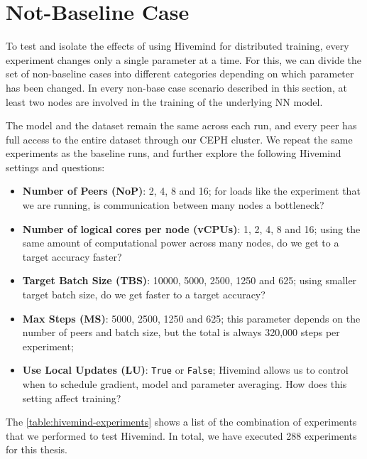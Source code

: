 \section{Not-Baseline Case}\label{sec:not-baseline-case}

To test and isolate the effects of using Hivemind for distributed training, every experiment changes only a single parameter at a time.
For this, we can divide the set of non-baseline cases into different categories depending on which parameter has been changed.
In every non-base case scenario described in this section, at least two nodes are involved in the training of the underlying NN model.

The model and the dataset remain the same across each run, and every peer has full access to the entire dataset through our CEPH cluster.
We repeat the same experiments as the baseline runs, and further explore the following Hivemind settings and questions:
\begin{itemize}
    \item \textbf{Number of Peers (NoP)}: 2, 4, 8 and 16; for loads like the experiment that we are running, is communication between many nodes a bottleneck?
    \item \textbf{Number of logical cores per node (vCPUs)}: 1, 2, 4, 8 and 16; using the same amount of computational power across many nodes, do we get to a target accuracy faster?
    \item \textbf{Target Batch Size (TBS)}: 10000, 5000, 2500, 1250 and 625; using smaller target batch size, do we get faster to a target accuracy?
    \item \textbf{Max Steps (MS)}: 5000, 2500, 1250 and 625; this parameter depends on the number of peers and batch size, but the total is always 320,000 steps per experiment;
    \item \textbf{Use Local Updates (LU)}: \texttt{True} or \texttt{False}; Hivemind allows us to control when to schedule gradient, model and parameter averaging. How does this setting affect training?
\end{itemize}

The \autoref{table:hivemind-experiments} shows a list of the combination of experiments that we performed to test Hivemind.
In total, we have executed 288 experiments for this thesis.


